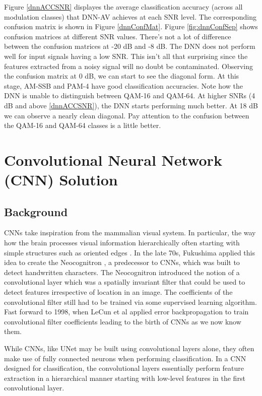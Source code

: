 \documentclass[journal,onecolumn]{IEEEtran}
\begin{document}
Figure \ref{dnnACCSNR} displayes the average classification accuracy (across all modulation classes) that DNN-AV achieves at each SNR level. The corresponding confusion matrix is shown in Figure \ref{dnnConfMat}. Figure \ref{fig:dnnConfSep} shows confusion matrices at different SNR values. There's not a lot of difference between the confusion matrices at -20 dB and -8 dB. The DNN does not perform well for input signals having a low SNR. This isn't all that surprising since the features extracted from a noisy signal will no doubt be contaminated. Observing the confusion matrix at 0 dB, we can start to see the diagonal form. At this stage, AM-SSB and PAM-4 have good classification accuracies. Note how the DNN is unable to distinguish between QAM-16 and QAM-64. At higher SNRs (4 dB and above \ref{dnnACCSNR}), the DNN starts performing much better. At 18 dB we can observe a nearly clean diagonal. Pay attention to the confusion between the QAM-16 and QAM-64 classes is a little better. 

\section{Convolutional Neural Network (CNN) Solution}

\subsection{Background}

CNNs take inspiration from the mammalian visual system. In particular, the way how the brain processes visual information hierarchically often starting with simple structures such as oriented edges \cite{catEye}. In the late 70s, Fukushima applied this idea to create the Neocognitron \cite{neocognitron}, a predecessor to CNNs, which was built to detect handwritten characters. The Neocognitron introduced the notion of a convolutional layer which was a spatially invariant filter that could be used to detect features irrespective of location in an image. The coefficients of the convolutional filter still had to be trained via some supervised learning algorithm. Fast forward to 1998, when LeCun et al \cite{lenet5} applied error backpropagation to train convolutional filter coefficients leading to the birth of CNNs as we now know them.

While CNNs, like UNet \cite{unet} may be built using convolutional layers alone, they often make use of fully connected neurons when performing classification. In a CNN designed for classification, the convolutional layers essentially perform feature extraction in a hierarchical manner starting with low-level features in the first convolutional layer.
\end{document}
